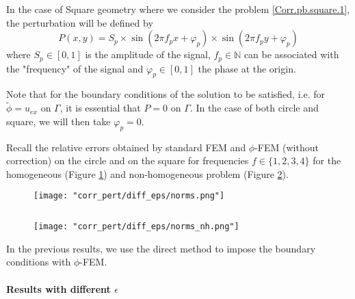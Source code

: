 In the case of Square geometry where we consider the problem \ref{Corr.pb.square.1}, the perturbation will be defined by
\begin{equation*}
	P(x,y)=S_p\times\sin\left(2\pi f_px+\varphi_p\right)\times\sin\left(2\pi f_py+\varphi_p\right)
\end{equation*}
where $S_p\in[0,1]$ is the amplitude of the signal, $f_p\in\mathbb{N}$ can be associated with the "frequency" of the signal and $\varphi_p\in[0,1]$ the phase at the origin.

\begin{Rem}
	Note that for the boundary conditions of the solution to be satisfied, i.e. for $\tilde{\phi}=u_{ex}$ on $\Gamma$, it is essential that $P=0$ on $\Gamma$. In the case of both circle and square, we will then take $\varphi_p=0$.
\end{Rem}

Recall the relative errors obtained by standard FEM and $\phi$-FEM (without correction) on the circle and on the square for frequencies $f\in\{1,2,3,4\}$ for the homogeneous  (Figure \ref{norms}) and non-homogeneous problem  (Figure \ref{norms_nh}).

\begin{minipage}{0.48\linewidth}
	\begin{figure}[H]
		\centering
		\texttt{[image: "corr\_pert/diff\_eps/norms.png"]}
		\label{norms}
	\end{figure} 
\end{minipage} $\qquad$
\begin{minipage}{0.48\linewidth}
	\begin{figure}[H]
		\centering
		\texttt{[image: "corr\_pert/diff\_eps/norms\_nh.png"]}
		\label{norms_nh}
	\end{figure} 
\end{minipage}

\begin{Rem}
	In the previous results, we use the direct method to impose the boundary conditions with $\phi$-FEM.
\end{Rem}

\paragraph{Results with different $\epsilon$} \label{Corr.results.disturbed.eps} 

